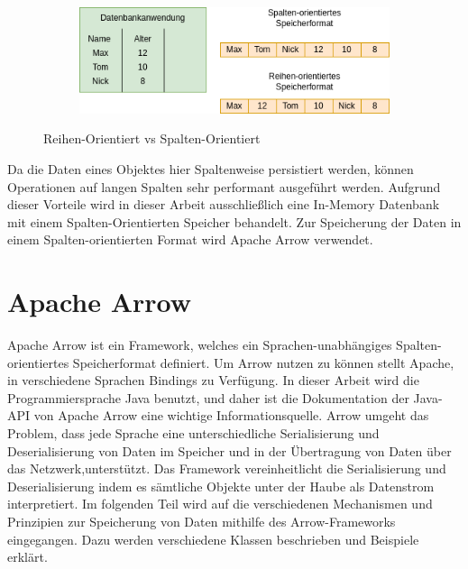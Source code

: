 \begin{figure}[h]
  \centering
  \begin{subfigure}[b]{0.5\textwidth}
    \includegraphics[width=1.0\linewidth]{img/speicher}
  \end{subfigure}
  \caption{Reihen-Orientiert vs Spalten-Orientiert}
  \label{graf_8}
\end{figure}

Da die Daten eines Objektes hier Spaltenweise persistiert werden, können Operationen auf langen Spalten sehr performant ausgeführt werden.
Aufgrund dieser Vorteile wird in dieser Arbeit ausschließlich eine In-Memory Datenbank mit einem Spalten-Orientierten Speicher behandelt.
Zur Speicherung der Daten in einem Spalten-orientierten Format wird Apache Arrow verwendet.

\section{Apache Arrow}

Apache Arrow ist ein Framework, welches ein Sprachen-unabhängiges Spalten-orientiertes Speicherformat definiert. 
Um Arrow nutzen zu können stellt Apache, in verschiedene Sprachen Bindings zu Verfügung. In dieser Arbeit wird die Programmiersprache Java benutzt, und daher ist die Dokumentation der Java-API von Apache Arrow eine wichtige Informationsquelle.\cite{Apache:Arrow:JavaApi}
Arrow umgeht das Problem, dass jede Sprache eine unterschiedliche Serialisierung und Deserialisierung von Daten im Speicher und in der Übertragung von Daten über das Netzwerk,unterstützt.
Das Framework vereinheitlicht die Serialisierung und Deserialisierung indem es sämtliche Objekte unter der Haube als Datenstrom interpretiert.
Im folgenden Teil wird auf die verschiedenen Mechanismen und Prinzipien zur Speicherung von Daten mithilfe des Arrow-Frameworks eingegangen. Dazu werden verschiedene Klassen beschrieben und Beispiele erklärt.



